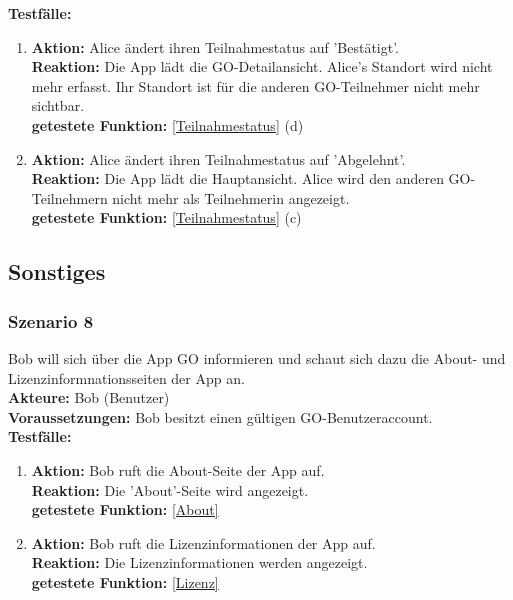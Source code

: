 \documentclass[parskip=full]{scrartcl}
\def\threedigits#1{%
  \ifnum#1<100 0\fi
  \ifnum#1<10 0\fi
  \number#1}
\begin{document}
\textbf{Testfälle:}
\begin{enumerate}[label={\textbf{/T\protect\threedigits{\theenumi}0/}}, leftmargin=*, resume]
	\item \textbf{Aktion:} Alice ändert ihren Teilnahmestatus auf 'Bestätigt'.\\
	\textbf{Reaktion:} Die App lädt die GO-Detailansicht. Alice's Standort wird nicht mehr erfasst. Ihr Standort ist für die anderen GO-Teilnehmer nicht mehr sichtbar.\\
	\textbf{getestete Funktion:} \ref{Teilnahmestatus} (d)
	\item \textbf{Aktion:} Alice ändert ihren Teilnahmestatus auf 'Abgelehnt'.\\
	\textbf{Reaktion:} Die App lädt die Hauptansicht. Alice wird den anderen GO-Teilnehmern nicht mehr als Teilnehmerin angezeigt.\\
	\textbf{getestete Funktion:} \ref{Teilnahmestatus} (c)
\end{enumerate}

\subsection{Sonstiges}

\subsubsection*{Szenario 8} Bob will sich über die App GO informieren und schaut sich dazu die About- und Lizenzinformnationsseiten der App an.\\

\textbf{Akteure:} Bob (Benutzer)\\

\textbf{Voraussetzungen:} Bob besitzt einen gültigen GO-Benutzeraccount.\\

\textbf{Testfälle:}
\begin{enumerate}[label={\textbf{/T\protect\threedigits{\theenumi}0/}}, leftmargin=*, resume]
	\item \textbf{Aktion:} Bob ruft die About-Seite der App auf.\\
	\textbf{Reaktion:} Die 'About'-Seite wird angezeigt.\\
	\textbf{getestete Funktion:} \ref{About}
	\item \textbf{Aktion:} Bob ruft die Lizenzinformationen der App auf.\\
	\textbf{Reaktion: }Die Lizenzinformationen werden angezeigt.\\
	\textbf{getestete Funktion:} \ref{Lizenz}
\end{enumerate}
\end{document}
